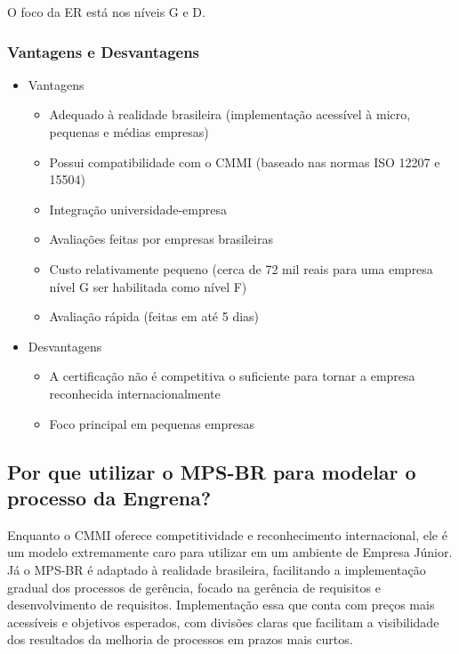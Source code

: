O foco da ER está nos níveis G e D.

\subsubsection{Vantagens e Desvantagens}

\begin{itemize}
	\item Vantagens
		\begin{itemize}
			\item Adequado à realidade brasileira (implementação acessível à micro, pequenas e médias empresas)
			\item Possui compatibilidade com o CMMI (baseado nas normas ISO 12207 e 15504)
			\item Integração universidade-empresa
			\item Avaliações feitas por empresas brasileiras
			\item Custo relativamente pequeno (cerca de 72 mil reais para uma empresa nível G ser habilitada como nível F)
			\item Avaliação rápida (feitas em até 5 dias)
		\end{itemize}
	\item Desvantagens
		\begin{itemize}
			\item A certificação não é competitiva o suficiente para tornar a empresa reconhecida internacionalmente
			\item Foco principal em pequenas empresas
		\end{itemize}
\end{itemize}

\subsection{Por que utilizar o MPS-BR para modelar o processo da Engrena?}

Enquanto o CMMI oferece competitividade e reconhecimento internacional, ele é um modelo extremamente caro para utilizar em um ambiente de Empresa Júnior.
Já o MPS-BR é adaptado à realidade brasileira, facilitando a implementação gradual dos processos de gerência, focado na gerência de requisitos e desenvolvimento de requisitos. Implementação essa que conta com preços mais acessíveis e objetivos esperados, com divisões claras que facilitam a visibilidade dos resultados da melhoria de processos em prazos mais curtos.